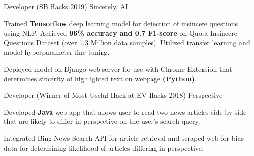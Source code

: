 

\begin{cventries}

  \cventry
    {Developer (SB Hacks 2019)} %
    {Sincerely, AI} %
    {} %
    {} %
    {
      \begin{cvitems} %
        \item {Trained \textbf{Tensorflow} deep learning model for detection of insincere questions using 
        NLP. Achieved \textbf{96\% accuracy and 0.7 F1-score} on Quora Insincere 
        Questions Dataset (over 1.3 Million data samples). Utilized transfer learning and model hyperparameter fine-tuning.}
        \item {Deployed model on Django web server for use with Chrome Extension that determines
        sincerity of highlighted text on webpage \textbf{(Python)}.}
      \end{cvitems}
    }

  \cventry
    {Developer (Winner of Most Useful Hack at EV Hacks 2018)} %
    {Perspective} %
    {} %
    {} %
    {
      \begin{cvitems} %
        \item {Developed \textbf{Java} web app that allows user to read two news articles side by side 
        that are likely to differ in perspective on the user's search query. }
        \item{Integrated Bing News Search API for article retrieval and scraped web for bias data for determining likelihood of articles differing in perspective.}
      \end{cvitems}
    }

\end{cventries}
